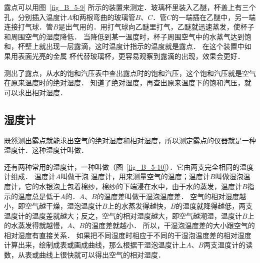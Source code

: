 露点可以用图~\ref{fig_B_5-9} 所示的装置来测定．玻璃杯里装入乙醚，杯盖上有三个孔，分别插入温度计$A$和两根弯曲的玻璃管$B$、$C$．管$C$的一端插在乙醚中，另一端连接打气球．管$B$是出气用的．用打气球向乙醚里打气，乙醚就迅速蒸发，使杯子和周围空气的湿度降低．
当降低到某一温度时，杯子周围空气中的水蒸气达到饱和，杯壁上就出现一层露滴，这时温度计指示的温度就是露点．
在这个装置中如果用表面光亮的金属
杯代替玻璃杯，更容易观察到露滴的出现，效果会更好．

测出了露点，从水的饱和汽压表中查出露点时的饱和汽压，这个饱和汽压就是空气在原来温度时的绝对湿度．
知道了绝对湿度，再查出原来温度下的饱和汽压，就可以求出相对湿度．

\subsection{湿度计} 
既然测出露点就能求出空气的绝对湿度和相对湿度，所以测定露点的仪器就是一种湿度计．这种湿度计叫做．


还有两种常用的湿度计，一种叫做（图~\ref{fig_B_5-10}）．它由两支完全相同的温度计组成．
温度计$A$叫做干泡
温度计，用来测量空气的温度；温度计$B$叫做湿泡温度计，它的水银泡上包着棉纱，棉纱的下端浸在水中，由于水的蒸发，温度计$B$指示的温度总是低于$A$的．$A$、$B$的温度差叫做干湿泡温度差．
空气的相对湿度越小，即空气越干燥，湿泡温度计$B$上的水蒸发得越快，$B$的温度就降得越低，两支温度计的温度差就越大；反之，空气的相对湿度越大，即空气越潮湿，温度计$B$上的水蒸发得就越慢，$A$、$B$的温度差就越小．
所以，干湿泡温度差的大小跟空气的相对湿度有直接关系．
如果把不同湿度时相应于不同的干湿泡温度差的相对湿度计算出来，绘制成表或画成曲线，那么根据干湿泡温度计上$A$、$B$两支温度计的读数，从表或曲线上很快就可以得出空气的相对湿度．


